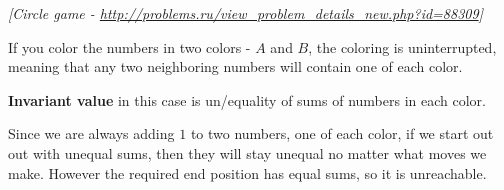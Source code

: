 \begin{problem}
\textit{[Circle game - \url{http://problems.ru/view_problem_details_new.php?id=88309}]}

If you color the numbers in two colors - $A$ and $B$, the coloring is uninterrupted, meaning that any two neighboring numbers will contain one of each color.

\textbf{Invariant value} in this case is un/equality of sums of numbers in each color. 

Since we are always adding $1$ to two numbers, one of each color, if we start out out with unequal sums, then they will stay unequal no matter what moves we make. However the required end position has equal sums, so it is unreachable.
\end{problem}
%




